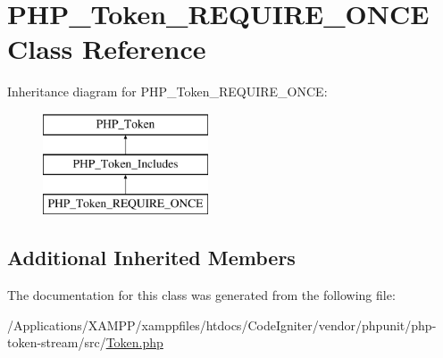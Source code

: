 \hypertarget{class_p_h_p___token___r_e_q_u_i_r_e___o_n_c_e}{}\section{P\+H\+P\+\_\+\+Token\+\_\+\+R\+E\+Q\+U\+I\+R\+E\+\_\+\+O\+N\+CE Class Reference}
\label{class_p_h_p___token___r_e_q_u_i_r_e___o_n_c_e}
Inheritance diagram for P\+H\+P\+\_\+\+Token\+\_\+\+R\+E\+Q\+U\+I\+R\+E\+\_\+\+O\+N\+CE\+:\begin{figure}[H]
\begin{center}
\leavevmode
\includegraphics[height=3.000000cm]{class_p_h_p___token___r_e_q_u_i_r_e___o_n_c_e}
\end{center}
\end{figure}
\subsection*{Additional Inherited Members}


The documentation for this class was generated from the following file\+:\begin{DoxyCompactItemize}
\item 
/\+Applications/\+X\+A\+M\+P\+P/xamppfiles/htdocs/\+Code\+Igniter/vendor/phpunit/php-\/token-\/stream/src/\mbox{\hyperlink{_token_8php}{Token.\+php}}\end{DoxyCompactItemize}
